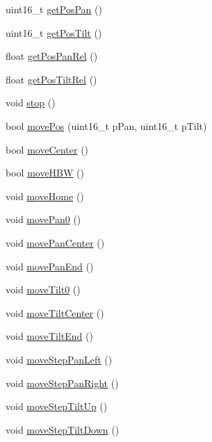 \begin{DoxyCompactItemize}
uint16\+\_\+t \hyperlink{classft_1_1_txt_pan_tilt_unit_a868812a59fb144a940c33d80133fc1c3}{get\+Pos\+Pan} ()
\item 
uint16\+\_\+t \hyperlink{classft_1_1_txt_pan_tilt_unit_a12d225cc056a07264df2f299513d3817}{get\+Pos\+Tilt} ()
\item 
float \hyperlink{classft_1_1_txt_pan_tilt_unit_a5cf016f88fffb4b12deaf184471fb571}{get\+Pos\+Pan\+Rel} ()
\item 
float \hyperlink{classft_1_1_txt_pan_tilt_unit_a2ff2da2bf36eb344e7281a2c45589f8b}{get\+Pos\+Tilt\+Rel} ()
\item 
void \hyperlink{classft_1_1_txt_pan_tilt_unit_a53db85ecbf3a4ca80d1197d8cb749625}{stop} ()
\item 
bool \hyperlink{classft_1_1_txt_pan_tilt_unit_adcb3f29ea47c30b2ce6dacafbe67fbef}{move\+Pos} (uint16\+\_\+t p\+Pan, uint16\+\_\+t p\+Tilt)
\item 
bool \hyperlink{classft_1_1_txt_pan_tilt_unit_ab50b506049d75fdf9cf1eea63bbba5b8}{move\+Center} ()
\item 
bool \hyperlink{classft_1_1_txt_pan_tilt_unit_a2502ef5731162177c2f90b7ddb4ec9cb}{move\+H\+BW} ()
\item 
void \hyperlink{classft_1_1_txt_pan_tilt_unit_aa4559d36c19193efce7fc64edb310194}{move\+Home} ()
\item 
void \hyperlink{classft_1_1_txt_pan_tilt_unit_a1513c7f1bfede9d6c2eda1501c195b78}{move\+Pan0} ()
\item 
void \hyperlink{classft_1_1_txt_pan_tilt_unit_a6d2a6b7b803a2263c915ca0545f89146}{move\+Pan\+Center} ()
\item 
void \hyperlink{classft_1_1_txt_pan_tilt_unit_a512c8430f27cae174e489fbf78e0f834}{move\+Pan\+End} ()
\item 
void \hyperlink{classft_1_1_txt_pan_tilt_unit_a906c2b58e965e1d9c0f1f0f6b0395c10}{move\+Tilt0} ()
\item 
void \hyperlink{classft_1_1_txt_pan_tilt_unit_ad2916df64a2a732a3bbe338e6d559f5e}{move\+Tilt\+Center} ()
\item 
void \hyperlink{classft_1_1_txt_pan_tilt_unit_a21f29747defca1c702146dd90b7e6441}{move\+Tilt\+End} ()
\item 
void \hyperlink{classft_1_1_txt_pan_tilt_unit_a31c69da70a912f62ea51ac8fb7167aa9}{move\+Step\+Pan\+Left} ()
\item 
void \hyperlink{classft_1_1_txt_pan_tilt_unit_a5330e54d284bd1de523fcc6cf93082e0}{move\+Step\+Pan\+Right} ()
\item 
void \hyperlink{classft_1_1_txt_pan_tilt_unit_a329beb715169e44e1c9a1d14a327bafd}{move\+Step\+Tilt\+Up} ()
\item 
void \hyperlink{classft_1_1_txt_pan_tilt_unit_aa7e4a9750b06e014956f63fd3b5fac35}{move\+Step\+Tilt\+Down} ()
\end{DoxyCompactItemize}
